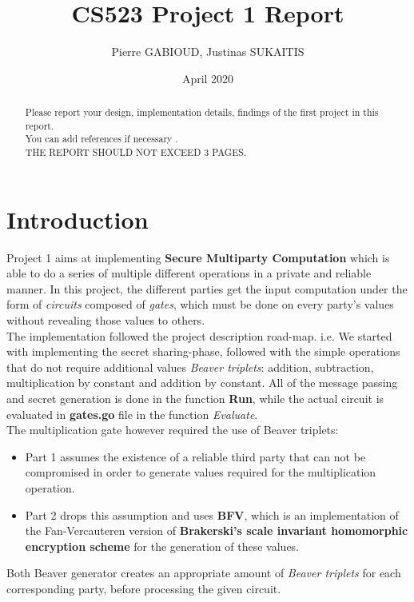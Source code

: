 \documentclass[10pt,conference,compsocconf]{IEEEtran}
\title{CS523 Project 1 Report}
\author{Pierre GABIOUD, Justinas SUKAITIS}
\date{April 2020}
\begin{document}
\maketitle

\begin{abstract}
    Please report your design, implementation details, findings of the first project in this report. \\
    You can add references if necessary \cite{article}. \\
    THE REPORT SHOULD NOT EXCEED 3 PAGES.
\end{abstract}
\section{Introduction}
Project 1 aims at implementing \textbf{Secure Multiparty Computation} which is able to do a series of multiple different operations in a private and reliable manner. 
In this project, the different parties get the input computation under the form of \textit{circuits} composed of \textit{gates}, which must be done on every party's values without revealing those values to others. \\

The implementation followed the project description road-map. i.e. We started with implementing the secret sharing-phase, followed with the simple operations that do not require additional values \textit{Beaver triplets}: addition, subtraction, multiplication by constant and addition by constant. All of the message passing and secret generation is done in the function \textbf{Run}, while the actual circuit is evaluated in \textbf{gates.go} file in the function \textit{Evaluate}. \\

\noindent The multiplication gate however required the use of Beaver triplets: \\
\begin{itemize}
\item Part 1 assumes the existence of a reliable third party that can not be compromised in order to generate values required for the multiplication operation. 
\item Part 2 drops this assumption and uses \textbf{BFV}, which is an implementation of the Fan-Vercauteren version of \textbf{Brakerski's scale invariant homomorphic encryption scheme} for the generation of these values. 
\end{itemize}
Both Beaver generator creates an appropriate amount of \textit{Beaver triplets} for each corresponding party, before processing the given circuit. \\
\end{document}
